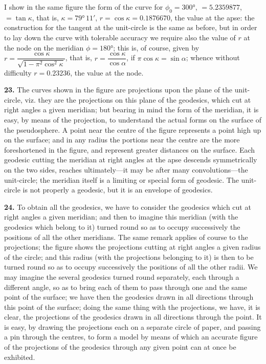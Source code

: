 \documentclass[11pt,a4paper]{book}
\begin{document}
I show in the same figure the form of the curve for $\phi_0 = 300°$, $= 5.2359877$, $= \tan\kappa$, that is, $\kappa = 79°\,11'$, $r = \cos\kappa = 0.1876670$, the value at the apse: the construction for the tangent at the unit-circle is the same as before, but in order to lay down the curve with tolerable accuracy we require also the value of $r$ at the node on the meridian $\phi = 180°$; this is, of course, given by $r = \dfrac{\cos\kappa}{\sqrt{1 - \pi^2\cos^2\kappa}}$, that is, $r = \dfrac{\cos\kappa}{\cos\alpha}$, if $\pi\cos\kappa = \sin\alpha$; whence without difficulty $r = 0.23236$, the value at the node.

\noindent\textbf{23.} The curves shown in the figure are projections upon the plane of the unit-circle, viz. they are the projections on this plane of the geodesics, which cut at right angles a given meridian; but bearing in mind the form of the meridian, it is easy, by means of the projection, to understand the actual forms on the surface of the pseudosphere. A point near the centre of the figure represents a point high up on the surface; and in any radius the portions near the centre are the more foreshortened in the figure, and represent greater distances on the surface. Each geodesic cutting the meridian at right angles at the apse descends symmetrically on the two sides, reaches ultimately---it may be after many convolutions---the unit-circle; the meridian itself is a limiting or special form of geodesic. The unit-circle is not properly a geodesic, but it is an envelope of geodesics.

\noindent\textbf{24.} To obtain all the geodesics, we have to consider the geodesics which cut at right angles a given meridian; and then to imagine this meridian (with the geodesics which belong to it) turned round so as to occupy successively the positions of all the other meridians. The same remark applies of course to the projections; the figure shows the projections cutting at right angles a given radius of the circle; and this radius (with the projections belonging to it) is then to be turned round so as to occupy successively the positions of all the other radii. We may imagine the several geodesics turned round separately, each through a different angle, so as to bring each of them to pass through one and the same point of the surface; we have then the geodesics drawn in all directions through this point of the surface; doing the same thing with the projections, we have, it is clear, the projections of the geodesics drawn in all directions through the point. It is easy, by drawing the projections each on a separate circle of paper, and passing a pin through the centres, to form a model by means of which an accurate figure of the projections of the geodesics through any given point can at once be exhibited.
\end{document}
